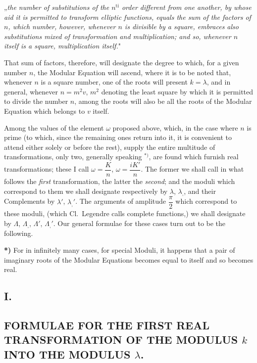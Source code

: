 \documentclass{article}
\begin{document}
„\emph{the number of substitutions of the $n^{\mathrm{ti}}$ order different from one another, by whose aid it is permitted to transform elliptic functions, equals the sum of the factors of $n$, which number, however, whenever $n$ is divisible by a square, embraces also substitutions mixed of transformation and multiplication; and so, whenever $n$ itself is a square, multiplication itself.}"

That sum of factors, therefore, will designate the degree to which, for a given number $n$, the Modular Equation will ascend, where it is to be noted that, whenever $n$ is a square number, one of the roots will present $k=\lambda$, and in general, whenever $n=m^{2}v$, $m^{2}$ denoting the least square by which it is permitted to divide the number $n$, among the roots will also be all the roots of the Modular Equation which belongs to $v$ itself.

Among the values of the element $\omega$ proposed above, which, in the case where $n$ is prime (to which, since the remaining ones return into it, it is convenient to attend either solely or before the rest), supply the entire multitude of transformations, only two, generally speaking ${}^{*)}$, are found which furnish real transformations; these I call $\omega=\dfrac{K}{n}$, $\omega=\dfrac{iK'}{n}$. The former we shall call in what follows the \emph{first} transformation, the latter the \emph{second}; and the moduli which correspond to them we shall designate respectively by $\lambda$, $\lambda_{,}$, and their Complements by $\lambda'$, $\lambda_{,}'$. The arguments of amplitude $\dfrac{\pi}{2}$ which correspond to these moduli, (which Cl.\ Legendre calls complete functions,) we shall designate by $\Lambda$, $\Lambda_{,}$, $\Lambda'$, $\Lambda_{,}'$. Our general formulae for these cases turn out to be the following.

\textbf{*)} For in infinitely many cases, for special Moduli, it happens that a pair of imaginary roots of the Modular Equations becomes equal to itself and so becomes real.

\subsection*{I.}

\subsection*{FORMULAE FOR THE FIRST REAL TRANSFORMATION OF THE MODULUS $k$ INTO THE MODULUS $\lambda$.}
\end{document}
